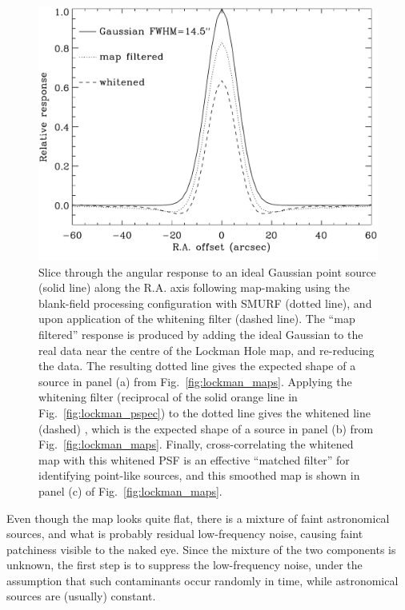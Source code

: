 \documentclass[useAMS,usenatbib,nofootinbib]{mn2e}
\begin{document}
\begin{figure}
\centering
\includegraphics[width=\linewidth]{lockman_psf}
\caption{Slice through the angular response to an ideal Gaussian point
  source (solid line) along the R.A. axis following map-making using
  the blank-field processing configuration with SMURF (dotted line),
  and upon application of the whitening filter (dashed line). The
  ``map filtered'' response is produced by adding the ideal Gaussian
  to the real data near the centre of the Lockman Hole map, and
  re-reducing the data. The resulting dotted line gives the expected
  shape of a source in panel (a) from
  Fig.~\ref{fig:lockman_maps}. Applying the whitening filter
  (reciprocal of the solid orange line in
  Fig.~\ref{fig:lockman_pspec}) to the dotted line gives the whitened
  line (dashed) , which is the expected shape of a source in panel (b)
  from Fig.~\ref{fig:lockman_maps}. Finally, cross-correlating the
  whitened map with this whitened PSF is an effective ``matched
  filter'' for identifying point-like sources, and this smoothed map
  is shown in panel (c) of Fig.~\ref{fig:lockman_maps}.}
\label{fig:lockman_psf}
\end{figure}

Even though the map looks quite flat, there is a mixture of faint
astronomical sources, and what is probably residual low-frequency
noise, causing faint patchiness visible to the naked eye. Since the
mixture of the two components is unknown, the first step is to
suppress the low-frequency noise, under the assumption that such
contaminants occur randomly in time, while astronomical sources are
(usually) constant.
\end{document}
